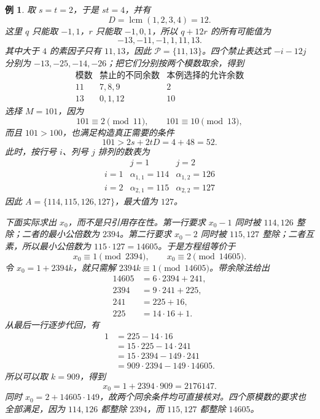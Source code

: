 \documentclass[UTF8,a4paper,oneside,openany,fontset=fandol,zihao=-4]{ctexbook}
\theoremstyle{guide}
\newtheorem{example}[theorem]{例}
\DeclareMathOperator{\lcm}{lcm}
\begin{document}
\begin{example}\label{up:two-by-two}
取 $s=t=2$，于是 $st=4$，并有
\[
D=\lcm(1,2,3,4)=12.
\]
这里 $q$ 只能取 $-1,1$，$r$ 只能取 $-1,0,1$，所以 $q+12r$ 的所有可能值为
\[
-13,-11,-1,1,11,13.
\]
其中大于 $4$ 的素因子只有 $11,13$，因此 $\mathcal P=\{11,13\}$。四个禁止表达式 $-i-12j$ 分别为 $-13,-25,-14,-26$；把它们分别按两个模数取余，得到
\[
\begin{array}{c|c|c}
\text{模数}&\text{禁止的不同余数}&\text{本例选择的允许余数}\\\hline
11&7,8,9&2\\
13&0,1,12&10
\end{array}
\]
选择 $M=101$，因为
\[
101\equiv2\pmod{11},\qquad101\equiv10\pmod{13},
\]
而且 $101>100$，也满足构造真正需要的条件
\[
101>2s+2tD=4+48=52.
\]
此时，按行号 $i$、列号 $j$ 排列的数表为
\[
\begin{array}{c|cc}
 &j=1&j=2\\\hline
i=1&\alpha_{1,1}=114&\alpha_{1,2}=126\\
i=2&\alpha_{2,1}=115&\alpha_{2,2}=127
\end{array}
\]
因此 $A=\{114,115,126,127\}$，最大值为 $127$。

下面实际求出 $x_0$，而不是只引用存在性。第一行要求 $x_0-1$ 同时被 $114,126$ 整除；二者的最小公倍数为 $2394$。第二行要求 $x_0-2$ 同时被 $115,127$ 整除；二者互素，所以最小公倍数为 $115\cdot127=14605$。于是方程组等价于
\[
x_0\equiv1\pmod{2394},\qquad
x_0\equiv2\pmod{14605}.
\]
令 $x_0=1+2394k$，就只需解 $2394k\equiv1\pmod{14605}$。带余除法给出
\begin{align*}
14605&=6\cdot2394+241,\\
2394&=9\cdot241+225,\\
241&=225+16,\\
225&=14\cdot16+1.
\end{align*}
从最后一行逐步代回，有
\begin{align*}
1&=225-14\cdot16\\
 &=15\cdot225-14\cdot241\\
 &=15\cdot2394-149\cdot241\\
 &=909\cdot2394-149\cdot14605.
\end{align*}
所以可以取 $k=909$，得到
\[
x_0=1+2394\cdot909=2176147.
\]
同时 $x_0=2+14605\cdot149$，故两个同余条件均可直接核对。四个原模数的要求也全部满足，因为 $114,126$ 都整除 $2394$，而 $115,127$ 都整除 $14605$。


\end{example}
\end{document}

